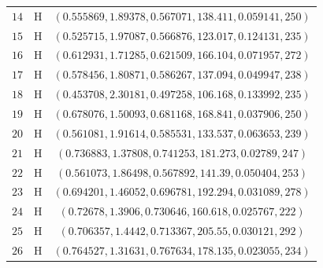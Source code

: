 \documentclass[\ifafour a4paper,12pt,\else a5paper,10pt,\fi%
onecolumn,oneside,article,%
british%
]{memoir}
\theoremstyle{remark}
\theoremstyle{innote}
\renewcommand*{\|}{\mathpunct{|}}
\newcommand*{\yH}{H}
\newcommand*{\yx}{x}
\newcommand*{\yxx}{\bm{\yx}}
\theoremstyle{plain}
\begin{document}
\begin{table}[!h]
\begin{tabular}[t]{@{}c@{\quad}c@{\quad}c@{}}
$14$ & H & $(0.555869, 1.89378, 0.567071, 138.411, 0.059141, 250)$ \\
$15$ & H & $(0.525715, 1.97087, 0.566876, 123.017, 0.124131, 235)$ \\
$16$ & H & $(0.612931, 1.71285, 0.621509, 166.104, 0.071957, 272)$ \\
$17$ & H & $(0.578456, 1.80871, 0.586267, 137.094, 0.049947, 238)$ \\
$18$ & H & $(0.453708, 2.30181, 0.497258, 106.168, 0.133992, 235)$ \\
$19$ & H & $(0.678076, 1.50093, 0.681168, 168.841, 0.037906, 250)$ \\
$20$ & H & $(0.561081, 1.91614, 0.585531, 133.537, 0.063653, 239)$ \\
$21$ & H & $(0.736883, 1.37808, 0.741253, 181.273, 0.02789, 247)$ \\
$22$ & H & $(0.561073, 1.86498, 0.567892, 141.39, 0.050404, 253)$ \\
$23$ & H & $(0.694201, 1.46052, 0.696781, 192.294, 0.031089, 278)$ \\
$24$ & H & $(0.72678, 1.3906, 0.730646, 160.618, 0.025767, 222)$ \\
$25$ & H & $(0.706357, 1.4442, 0.713367, 205.55, 0.030121, 292)$ \\
$26$ & H & $(0.764527, 1.31631, 0.767634, 178.135, 0.023055, 234)$ \\[4\jot]


\end{tabular}
\end{table}
\end{document}
